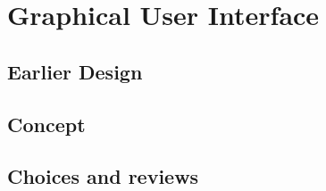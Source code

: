 \chapter{Graphical User Interface}

\section{Earlier Design}

\section{Concept}

\section{Choices and reviews}